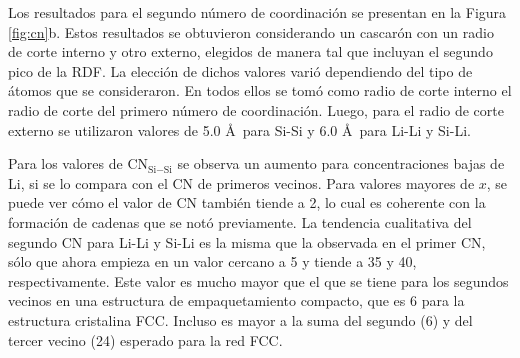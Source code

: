 Los resultados para el segundo número de coordinación se presentan en la Figura 
\ref{fig:cn}b. Estos resultados se obtuvieron considerando un cascarón con un 
radio de corte interno y otro externo, elegidos de manera tal que incluyan el 
segundo pico de la RDF. La elección de dichos valores varió dependiendo del tipo
de átomos que se consideraron. En todos ellos se tomó como radio de corte interno 
el radio de corte del primero número de coordinación. Luego, para el radio de 
corte externo se utilizaron valores de 5.0 \AA\ para Si-Si y 6.0 \AA\ para Li-Li
y Si-Li.

Para los valores de CN$_{\text{Si}-\text{Si}}$ se observa un aumento para concentraciones bajas
de Li, si se lo compara con el CN de primeros vecinos. Para valores mayores de $x$,
se puede ver cómo el valor de CN también tiende a 2, lo cual es coherente con la
formación de cadenas que se notó previamente. La tendencia cualitativa del segundo
CN para Li-Li y Si-Li es la misma que la observada en el primer CN, sólo que ahora
empieza en un valor cercano a 5 y tiende a 35 y 40, respectivamente. Este valor 
es mucho mayor que el que se tiene para los segundos vecinos en una estructura 
de empaquetamiento compacto, que es 6 para la estructura cristalina FCC. Incluso 
es mayor a la suma del segundo (6) y del tercer vecino (24) esperado para la red 
FCC.

